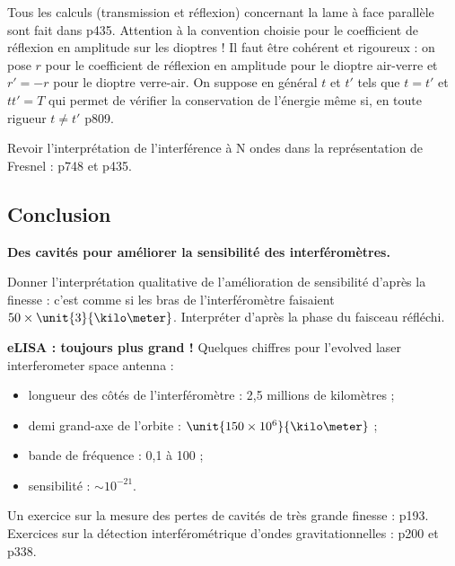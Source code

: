 \begin{remarque}
Tous les calculs (transmission et réflexion) concernant la lame à face parallèle sont fait dans \cite{Hecht2002} p435.
Attention à la convention choisie pour le coefficient de réflexion en amplitude sur les dioptres !
Il faut être cohérent et rigoureux : on pose $r$ pour le coefficient de réflexion en amplitude pour le dioptre air-verre et $r'=-r$ pour le dioptre verre-air.
On suppose en général $t$ et $t'$ tels que $t=t'$ et $tt'=T$ qui permet de vérifier la conservation de l'énergie même si, en toute rigueur $t\ne t'$ \cite{Olivier2000} p809.

\noindent
Revoir l'interprétation de l'interférence à N ondes dans la représentation de Fresnel : \cite{Sanz2016} p748 et \cite{Hecht2002} p435.  
\end{remarque}

\subsection*{Conclusion}

\begin{slide}
\textbf{Des cavités pour améliorer la sensibilité des interféromètres.}
\end{slide}

Donner l'interprétation qualitative de l'amélioration de sensibilité d'après la finesse : c'est comme si les bras de l'interféromètre faisaient $50\times \unit{3}{\kilo\meter}$.
Interpréter d'après la phase du faisceau réfléchi.

\begin{slide}
\textbf{eLISA : toujours plus grand !}
Quelques chiffres pour l'evolved laser interferometer space antenna :
\begin{itemize}
\item longueur des côtés de l'interféromètre : 2{,}5 millions de kilomètres ;
\item demi grand-axe de l'orbite : $\unit{150\times10^6}{\kilo\meter}$ ;
\item bande de fréquence : 0{,}1 à \unit{100}{\milli\hertz} ;
\item sensibilité : $\sim 10^{-21}$.
\end{itemize}
\end{slide}

\begin{funfact}
Un exercice sur la mesure des pertes de cavités de très grande finesse : \cite{Graner2011} p193.
Exercices sur la détection interférométrique d'ondes gravitationnelles : \cite{Graner2011} p200 et \cite{Augier2014} p338.
\end{funfact}


\newpage